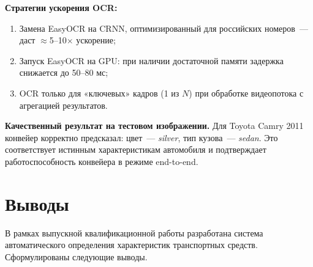 \documentclass[14pt,a4paper]{report}
\numberwithin{equation}{chapter}
\numberwithin{figure}{chapter}
\numberwithin{table}{chapter}
\begin{document}
\textbf{Стратегии ускорения OCR:}
\begin{enumerate}[nosep]
  \item Замена EasyOCR на CRNN, оптимизированный для российских
    номеров~--- даст $\approx$5--10$\times$ ускорение;
  \item Запуск EasyOCR на GPU: при наличии достаточной памяти
    задержка снижается до 50--80 мс;
  \item OCR только для «ключевых» кадров (1 из $N$) при обработке
    видеопотока с агрегацией результатов.
\end{enumerate}

\textbf{Качественный результат на тестовом изображении.}
Для Toyota Camry 2011 конвейер корректно предсказал:
цвет~--- \textit{silver}, тип кузова~--- \textit{sedan}.
Это соответствует истинным характеристикам автомобиля и
подтверждает работоспособность конвейера в режиме end-to-end.

\chapter{Выводы}

В рамках выпускной квалификационной работы разработана система автоматического
определения характеристик транспортных средств. Сформулированы следующие выводы.
\end{document}

